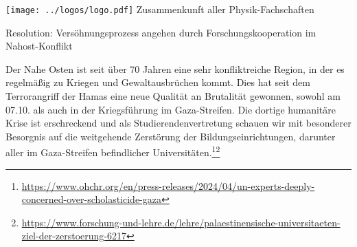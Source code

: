 \documentclass[DIV=calc]{scrartcl}
\begin{document}
\hspace{0.87\textwidth}
\begin{minipage}{120pt}
	\vspace{-1.8cm}
	\texttt{[image: ../logos/logo.pdf]}
	\centering
	\small Zusammenkunft aller Physik-Fachschaften
\end{minipage}

\begin{center}
  \huge{Resolution: Versöhnungsprozess angehen durch Forschungskooperation im Nahost-Konflikt}\vspace{.25\baselineskip}\\
  \normalsize
\end{center}
\vspace{1cm}







Der Nahe Osten ist seit über 70 Jahren eine sehr konfliktreiche Region, in der es regelmäßig zu Kriegen und Gewaltausbrüchen kommt. Dies hat seit dem Terrorangriff der Hamas eine neue Qualität an Brutalität gewonnen, sowohl am 07.10. als auch in der Kriegsführung im Gaza-Streifen. Die dortige humanitäre Krise ist erschreckend und als Studierendenvertretung schauen wir mit besonderer Besorgnis auf die weitgehende Zerstörung der Bildungseinrichtungen, darunter aller im Gaza-Streifen befindlicher Universitäten.\footnote{\url{https://www.ohchr.org/en/press-releases/2024/04/un-experts-deeply-concerned-over-scholasticide-gaza}}\footnote{\url{https://www.forschung-und-lehre.de/lehre/palaestinensische-universitaeten-ziel-der-zerstoerung-6217}}
  
\end{document}
